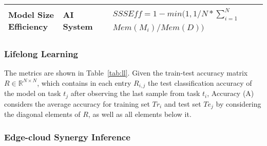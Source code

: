 \begin{table}[h!]
\begin{tabular}{|p{2cm}|l|p{6cm}|p{3cm}|p{1.5cm}|}
Model Size Efficiency
& AI System
& 
\parbox{3cm}{
    \begin{equation} \label{equ:ssse} 
    \begin{split}
& SSSEff = 1 - min(1, 1/N * \sum_{i=1}^N \\
& Mem(M_i) / Mem(D))
    \end{split} 
    \end{equation} 
}
&  
& \cite{DBLP:journals/corr/abs-1810-13166,DBLP:conf/nips/Lopez-PazR17}       
\\ \hline

\end{tabular}
\end{table}




\subsubsection{Lifelong Learning}

The metrics are shown in Table~\ref{tab:ll}. Given the train-test accuracy matrix $R \in \mathbb{R}^{N \times N}$, which contains in each entry $R_{i,j}$ the test classification accuracy of the model on task $t_j$ after observing the last sample from task $t_i$, Accuracy (A) considers the average accuracy for training set $Tr_i$ and test set $Te_j$ by considering the diagonal elements of $R$, as well as all elements below it. 

















\subsubsection{Edge-cloud Synergy Inference}

